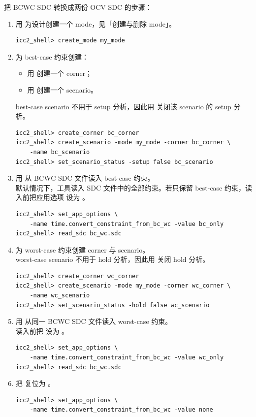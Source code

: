 把 BCWC SDC 转换成两份 OCV SDC 的步骤：
\begin{enumerate}
  \item 用  为设计创建一个 mode，见「创建与删除 mode」。
\begin{lstlisting}
icc2_shell> create_mode my_mode
\end{lstlisting}
  \item 为 best-case 约束创建：
  \begin{itemize}
    \item 用  创建一个 corner；
    \item 用  创建一个 scenario。
  \end{itemize}
        best-case scenario 不用于 setup 分析，因此用  关闭该 scenario 的 setup 分析。
\begin{lstlisting}
icc2_shell> create_corner bc_corner
icc2_shell> create_scenario -mode my_mode -corner bc_corner \
    -name bc_scenario
icc2_shell> set_scenario_status -setup false bc_scenario
\end{lstlisting}
  \item 用  从 BCWC SDC 文件读入 best-case 约束。\\
        默认情况下，工具读入 SDC 文件中的全部约束。若只保留 best-case 约束，读入前把应用选项  设为 。
\begin{lstlisting}
icc2_shell> set_app_options \
    -name time.convert_constraint_from_bc_wc -value bc_only
icc2_shell> read_sdc bc_wc.sdc
\end{lstlisting}
  \item 为 worst-case 约束创建 corner 与 scenario。\\
        worst-case scenario 不用于 hold 分析，因此用  关闭 hold 分析。
\begin{lstlisting}
icc2_shell> create_corner wc_corner
icc2_shell> create_scenario -mode my_mode -corner wc_corner \
    -name wc_scenario
icc2_shell> set_scenario_status -hold false wc_scenario
\end{lstlisting}
  \item 用  从同一 BCWC SDC 文件读入 worst-case 约束。\\
        读入前把  设为 。
\begin{lstlisting}
icc2_shell> set_app_options \
    -name time.convert_constraint_from_bc_wc -value wc_only
icc2_shell> read_sdc bc_wc.sdc
\end{lstlisting}
  \item 把  复位为 。
\begin{lstlisting}
icc2_shell> set_app_options \
    -name time.convert_constraint_from_bc_wc -value none
\end{lstlisting}
\end{enumerate}

